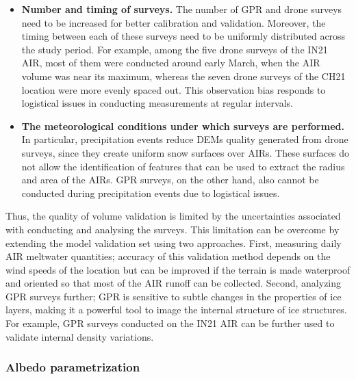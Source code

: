 \begin{itemize}
  \item \textbf{Number and timing of surveys.} The number of \ac{GPR} and drone surveys need to be increased for
    better calibration and validation. Moreover, the timing between each of these surveys need to be uniformly
    distributed across the study period. For example, among the five drone surveys of the IN21 \ac{AIR}, most of them
    were conducted around early March, when the \ac{AIR} volume was near its maximum, whereas the seven drone
    surveys of the CH21 location were more evenly spaced out. This observation bias responds to logistical
    issues in conducting measurements at regular intervals.

  \item \textbf{The meteorological conditions under which surveys are performed.} In particular, precipitation
    events reduce \ac{DEMs} quality generated from drone surveys, since they create uniform snow surfaces over
    \ac{AIRs}. These surfaces do not allow the identification of features that can be used to extract the radius
    and area of the \ac{AIRs}. \ac{GPR} surveys, on the other hand, also cannot be conducted during
    precipitation events due to logistical issues. 

\end{itemize}

Thus, the quality of volume validation is limited by the uncertainties associated with conducting and analysing
the surveys. This limitation can be overcome by extending the model validation set using two approaches. First,
measuring daily \ac{AIR} meltwater quantities; accuracy of this validation method depends on the wind speeds of
the location but can be improved if the terrain is made waterproof and oriented so that most of the \ac{AIR}
runoff can be collected. Second, analyzing \ac{GPR} surveys further; \ac{GPR} is sensitive to subtle changes in
the properties of ice layers, making it a powerful tool to image the internal structure of ice structures. For
example, \ac{GPR} surveys conducted on the IN21 \ac{AIR} \citep{balasubramanian_suryanarayanan_2022_7056646} can
be further used to validate internal density variations.

\subsubsection{Albedo parametrization}

